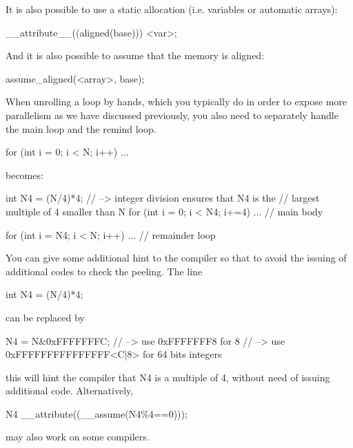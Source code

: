 It is also possible to use a static allocation (i.e. variables or automatic arrays):

\begin{codeblock}[language=C, numbers=none]
__attribute__((aligned(base))) <var>;
\end{codeblock}

And it is also possible to assume that the memory is aligned:

\begin{codeblock}[language=C, numbers=none]
assume_aligned(<array>, base);
\end{codeblock}

\begin{observationblock}
    When unrolling a loop by hands, which you typically do in order to expose more parallelism as we have discussed previously, you also need to separately handle the main loop and the remind loop.
    \begin{codeblock}[language=C]
for (int i = 0; i < N; i++) ... 
    \end{codeblock}
    becomes:
    \begin{codeblock}[language=C]
int N4 = (N/4)*4;   // --> integer division ensures that N4 is the 
                    // largest multiple of 4 smaller than N 
for (int i = 0; i < N4; i+=4) ... // main body 

for (int i = N4; i < N; i++) ... // remainder loop 
    \end{codeblock}
    You can give some additional hint to the compiler so that to avoid the issuing of additional codes to check the peeling. The line 
    \begin{codeblock}[language=C]
int N4 = (N/4)*4;
    \end{codeblock}
    can be replaced by 
    \begin{codeblock}[language=C]
N4 = N&0xFFFFFFFC;  // --> use 0xFFFFFFF8 for 8
                    // --> use 0xFFFFFFFFFFFFFFF<C|8> for 64 bits integers
    \end{codeblock}
    this will hint the compiler that N4 is a multiple of 4, without need of issuing additional code. Alternatively,
    \begin{codeblock}[language=C]
N4 __attribute((__assume(N4\%4==0)));
    \end{codeblock}
    may also work on some compilers.
\end{observationblock}


